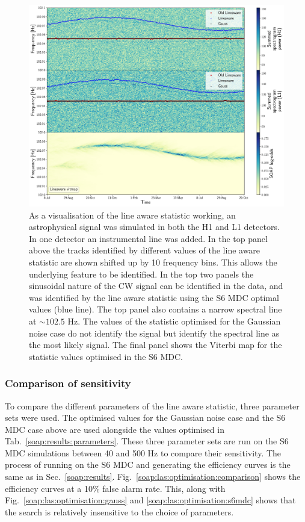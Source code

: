 \begin{figure}[h]
    \centering
    \includegraphics[width=0.9\linewidth]{C3_soap/line_example.pdf}
    \caption[Example of improvements when using optimised parameters for line aware statistic.]{As a visualisation of the line aware statistic working, an astrophysical signal was simulated in both the H1 and L1 detectors. In one detector an instrumental line was added. In the top panel above the tracks identified by different values of the line aware statistic are shown shifted up by 10 frequency bins. This allows the underlying feature to be identified. In the top two panels the sinusoidal nature of the \gls{CW} signal can be identified in the data, and was identified by the line aware statistic using the S6 MDC optimal values (blue line). The top panel also contains a narrow spectral line at $\sim 102.5$ Hz. The values of the statistic optimised for the Gaussian noise case do not identify the signal but identify the spectral line as the most likely signal. The final panel shows the Viterbi map for the statistic values optimised in the S6 MDC. }
    \label{soap:las:optimisation:vitexample}
\end{figure}

\subsubsection{\label{soap:las:optimisation:comp_sens}Comparison of sensitivity}

To compare the different parameters of the line aware statistic, three parameter sets were used. 
The optimised values for the Gaussian noise case and the S6 \gls{MDC} case above are used alongside the values optimised in Tab.~\ref{soap:results:parameters}.
These three parameter sets are run on the S6 \gls{MDC} simulations between 40 and 500 Hz to compare their sensitivity. 
The process of running on the S6 \gls{MDC} and generating the efficiency curves is the same as in Sec.~\ref{soap:results}.
Fig.~\ref{soap:las:optimisation:comparison} shows the efficiency curves at a 10\% false alarm rate. 
This, along with Fig.~\ref{soap:las:optimisation:gauss} and \ref{soap:las:optimisation:s6mdc} shows that the search is relatively insensitive to the choice of parameters.

